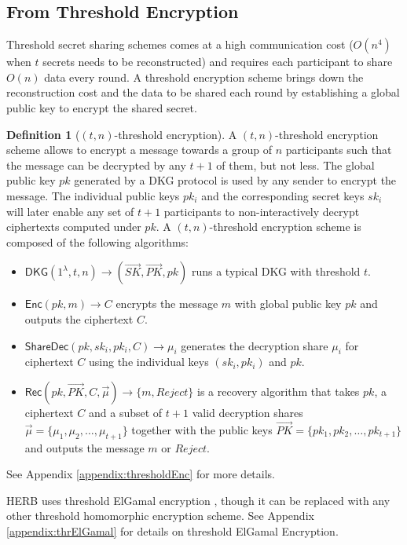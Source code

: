 \documentclass[letterpaper,twocolumn,10pt]{article}
\theoremstyle{definition}
\newtheorem{definition}[theorem]{Definition}
\theoremstyle{remark}
\begin{document}
\subsection{From Threshold Encryption}
Threshold secret sharing schemes comes at a high communication cost ($O(n^4)$ when $t$ secrets needs to be reconstructed) and requires each participant to share $O(n)$ data every round. A threshold encryption scheme brings down the reconstruction cost and the data to be shared each round by establishing a global public key to encrypt the shared secret.
\begin{definition}[$(t, n)$-threshold encryption] 
A $(t, n)$-threshold encryption scheme allows to encrypt a message towards a group of $n$ participants such that the message can be decrypted by any $t+1$ of them, but not less. The global public key $pk$ generated by a DKG protocol is used by any sender to encrypt the message. The individual public keys $pk_i$ and the corresponding secret keys $sk_i$ will later enable any set of $t + 1$ participants to non-interactively decrypt ciphertexts computed under $pk$. A $(t, n)$-threshold encryption scheme is composed of the following algorithms:
\begin{itemize}
    \item $\mathsf{DKG}(1^\lambda, t, n) \rightarrow (\vec{SK}, \vec{PK}, pk)$ runs a typical DKG with threshold $t$.
    \item $\mathsf{Enc}(pk, m) \rightarrow C$ encrypts the message $m$ with global public key $pk$ and outputs the ciphertext $C$.
    \item $\mathsf{ShareDec}(pk, sk_i, pk_i, C) \rightarrow \mu_i$ generates the decryption share $\mu_i$ for ciphertext $C$ using the individual keys $(sk_i, pk_i)$ and $pk$.
    \item $\mathsf{Rec}(pk, \vec{PK}, C, \vec{\mu} )\rightarrow \{m, Reject\}$ is a recovery algorithm that takes $pk$, a ciphertext $C$ and a subset of $t+1$ valid decryption shares $\vec{\mu} = \{\mu_1, \mu_2,\ldots, \mu_{t+1}\}$ together with the public keys $\vec{PK} = \{pk_1, pk_2,\ldots, pk_{t+1}\}$ and outputs the message $m$ or $Reject$.
\end{itemize}
See Appendix \ref{appendix:thresholdEnc} for more details.
\end{definition}
HERB \cite{cherniaeva2019homomorphic} uses threshold ElGamal encryption \cite{desmedt1990Threshold}, though it can be replaced with any other threshold homomorphic encryption scheme. See Appendix \ref{appendix:thrElGamal} for details on threshold ElGamal Encryption.\\\\
\end{document}

